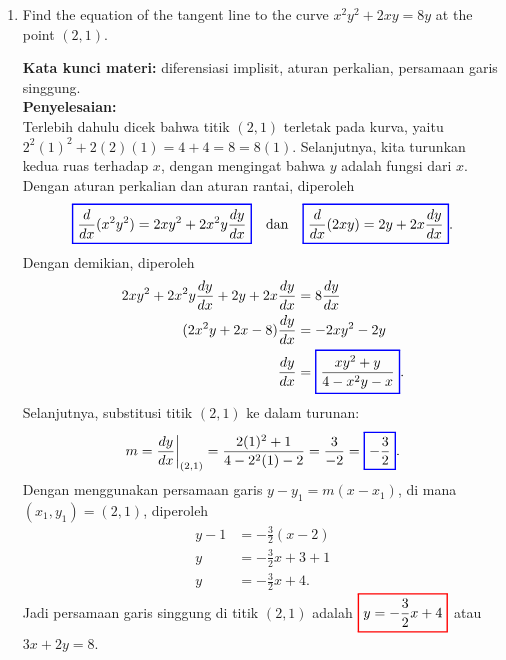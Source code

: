 \documentclass[10pt,openany,a4paper]{article}
\theoremstyle{definition}
\theoremstyle{definition}
\theoremstyle{plain}
\newenvironment{jawab}[2][tes]{%
\par\noindent\textbf{Kata kunci materi:} #1.\\
\textbf{Penyelesaian:} #2%
}{}
\begin{document}
\begin{enumerate}
    \item Find the equation of the tangent line to the curve $x^2y^2+2xy=8y$ at the point $(2,1)$.
    \begin{jawab}[diferensiasi implisit, aturan perkalian, persamaan garis singgung]{~\\
        Terlebih dahulu dicek bahwa titik $(2,1)$ terletak pada kurva, yaitu $2^2(1)^2+2(2)(1)=4+4=8=8(1)$. Selanjutnya, kita turunkan kedua ruas terhadap $x$, dengan mengingat bahwa $y$ adalah fungsi dari $x$. Dengan aturan perkalian dan aturan rantai, diperoleh
        \begin{align*}
            \colorlet{oldcolor}{.}
        \color{blue}
        \setlength{\fboxrule}{1pt} \boxed{\color{oldcolor}\frac{d}{dx}(x^2y^2) = 2xy^2 + 2x^2y\frac{dy}{dx}}\color{oldcolor} \quad\text{dan}\quad \colorlet{oldcolor}{.}
        \color{blue}
        \setlength{\fboxrule}{1pt} \boxed{\color{oldcolor}\frac{d}{dx}(2xy) = 2y + 2x\frac{dy}{dx}}\color{oldcolor}.
        \end{align*}
        Dengan demikian, diperoleh
        \begin{align*}
            2xy^2 + 2x^2y\frac{dy}{dx} + 2y + 2x\frac{dy}{dx} &= 8\frac{dy}{dx}\\
            (2x^2y + 2x - 8)\frac{dy}{dx} &= -2xy^2 - 2y\\
            \frac{dy}{dx} &= \colorlet{oldcolor}{.}
        \color{blue}
        \setlength{\fboxrule}{1pt} \boxed{\color{oldcolor}\frac{xy^2 + y}{4 - x^2y - x}}\color{oldcolor}.
        \end{align*}
        Selanjutnya, substitusi titik $(2,1)$ ke dalam turunan:
        \begin{align*}
            m = \frac{dy}{dx}\bigg|_{(2,1)} = \frac{2(1)^2 + 1}{4 - 2^2(1) - 2} = \frac{3}{-2} = \colorlet{oldcolor}{.}
        \color{blue}
        \setlength{\fboxrule}{1pt} \boxed{\color{oldcolor}-\frac{3}{2}}\color{oldcolor}.
        \end{align*}
        Dengan menggunakan persamaan garis $y - y_1 = m(x - x_1)$, di mana $(x_1,y_1)=(2,1)$, diperoleh
        \begin{align*}
            y - 1 &= -\frac{3}{2}(x - 2)\\
            y &= -\frac{3}{2}x + 3 + 1\\
            y &= -\frac{3}{2}x + 4.
        \end{align*}
        Jadi persamaan garis singgung di titik $(2,1)$ adalah $\colorlet{oldcolor}{.}
        \color{red}
        \setlength{\fboxrule}{1pt} \boxed{\color{oldcolor}y = -\frac{3}{2}x + 4}\color{oldcolor}$ atau $3x+2y=8$.
    }
    \end{jawab}
\end{enumerate}
\end{document}
